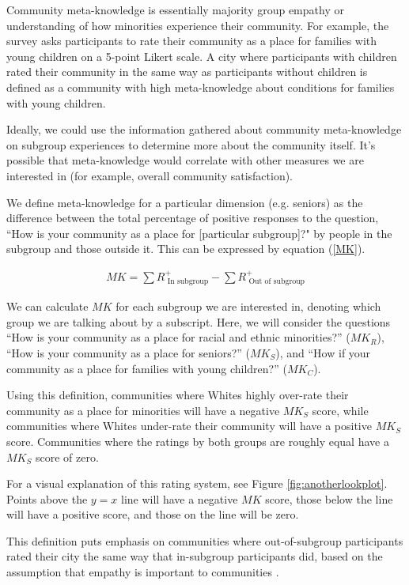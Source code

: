 \documentclass[smallextended]{svjour3}\usepackage[]{graphicx}\usepackage[]{color}
\begin{document}
Community meta-knowledge is essentially majority group empathy or understanding of how minorities experience their community. For example, the survey asks participants to rate their community as a place for families with young children on a 5-point Likert scale. A city where participants with children rated their community in the same way as participants without children is defined as a community with high meta-knowledge about conditions for families with young children. 

Ideally, we could use the information gathered about community meta-knowledge on subgroup experiences to determine more about the community itself. It's possible that meta-knowledge would correlate with other measures we are interested in (for example, overall community satisfaction). 

We define meta-knowledge for a particular dimension (e.g. seniors) as the difference between the total percentage of positive responses to the question, ``How is your community as a place for [particular subgroup]?" by people in the subgroup and those outside it. This can be expressed by equation (\ref{MK}). 

\begin{eqnarray}
\label{MK}
MK = \sum R^{+}_{\mbox{ In subgroup}} - \sum R^{+}_{\mbox{ Out of subgroup}}
\end{eqnarray}

We can calculate $MK$ for each subgroup we are interested in, denoting which group we are talking about by a subscript. Here, we will consider the questions ``How is your community as a place for racial and ethnic minorities?'' ($MK_R$), ``How is your community as a place for seniors?'' ($MK_S$), and ``How if your community as a place for families with young children?'' ($MK_C$).

Using this definition, communities where Whites highly over-rate their community as a place for minorities will have a negative $MK_S$ score, while communities where Whites under-rate their community will have a positive $MK_S$ score. Communities where the ratings by both groups are roughly equal have a $MK_S$ score of zero. 

For a visual explanation of this rating system, see Figure \ref{fig:anotherlookplot}. Points above the $y=x$ line will have a negative $MK$ score, those below the line will have a positive score, and those on the line will be zero.

This definition puts emphasis on communities where out-of-subgroup participants rated their city the same way that in-subgroup participants did, based on the assumption that empathy is important to communities \citep{SteFin1999}. 
\end{document}
